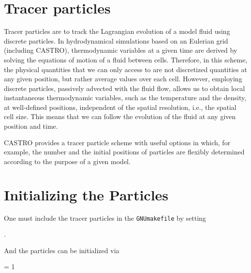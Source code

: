 
 
 
%




\section{Tracer particles}

Tracer particles are to track the Lagrangian evolution of a model fluid using discrete particles. In hydrodynamical simulations based on an Eulerian grid (including CASTRO), thermodynamic variables at a given time are derived by solving the equations of motion of a fluid between cells. Therefore, in this scheme, the physical quantities that we can only access to are not discretized quantities at any given position, but rather average values over each cell. However, employing discrete particles, passively advected with the fluid flow, allows us to obtain local instantaneous thermodynamic variables, such as the temperature and the density, at well-defined positions, independent of the spatial resolution, i.e., the spatial cell size. This means that we can follow the evolution of the fluid at any given position and time. 

\noindent CASTRO provides a tracer particle scheme with useful options in which, for example, the number and the initial positions of particles are flexibly determined according to the purpose of a given model. 


\section{Initializing the Particles}

One must include the tracer particles in the {\tt GNUmakefile} by setting

\vspace{0.1in}
.
\vspace{0.1in}

\noindent And the particles can be initialized via

\vspace{0.1in}
     = 1
\vspace{0.1in}

